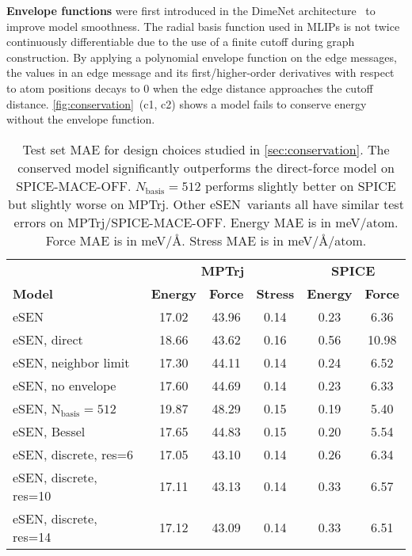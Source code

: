 \documentclass[twocolumn]{fairmeta}
\newcommand{\ourmodel}{eSEN}
\begin{document}
\textbf{Envelope functions} were first introduced in the DimeNet architecture~\citep{gasteiger2020directional} to improve model smoothness. The radial basis function used in MLIPs is not twice continuously differentiable due to the use of a finite cutoff during graph construction. By applying a polynomial envelope function on the edge messages, the values in an edge message and its first/higher-order derivatives with respect to atom positions decays to 0 when the edge distance approaches the cutoff distance. \cref{fig:conservation}~(c1, c2) shows a model fails to conserve energy without the envelope function.

\begin{table}[t]\centering
\caption{
Test set MAE for design choices studied in \cref{sec:conservation}. The conserved model significantly outperforms the direct-force model on SPICE-MACE-OFF. $N_{\mathrm{basis}}=512$ performs slightly better on SPICE but slightly worse on MPTrj. Other \ourmodel\ variants all have similar test errors on MPTrj/SPICE-MACE-OFF. Energy MAE is in meV/atom. Force MAE is in meV/\AA. Stress MAE is in meV/\AA/atom.
\label{tab:design_test_error}
}
\begin{adjustbox}{width=\linewidth}
\begin{tabular}{l|ccc|cc}
\toprule
 & \multicolumn{3}{c|}{\textbf{MPTrj}} & \multicolumn{2}{c}{\textbf{SPICE}} \\
\textbf{Model} & \textbf{Energy} & \textbf{Force} & \textbf{Stress} & \textbf{Energy} & \textbf{Force} \\
\midrule
\ourmodel & 17.02 & 43.96 & 0.14 & 0.23 & 6.36 \\
\ourmodel, direct & 18.66 & 43.62 & 0.16 & 0.56 & 10.98 \\
\ourmodel, neighbor limit & 17.30 & 44.11 & 0.14 & 0.24 & 6.52 \\
\ourmodel, no envelope & 17.60 & 44.69 & 0.14 & 0.23 & 6.33 \\
\ourmodel, $\mathrm{N}_{\mathrm{basis}}=512$ & 19.87 & 48.29 & 0.15 & 0.19 & 5.40 \\
\ourmodel, Bessel & 17.65 & 44.83 & 0.15 & 0.20 & 5.54 \\
\ourmodel, discrete, res=6 & 17.05 & 43.10 & 0.14 & 0.26 & 6.34 \\
\ourmodel, discrete, res=10 & 17.11 & 43.13 & 0.14 & 0.33 & 6.57 \\
\ourmodel, discrete, res=14 & 17.12 & 43.09 & 0.14 & 0.33 & 6.51 \\
\bottomrule
\end{tabular}
\end{adjustbox}
\end{table}
\end{document}
